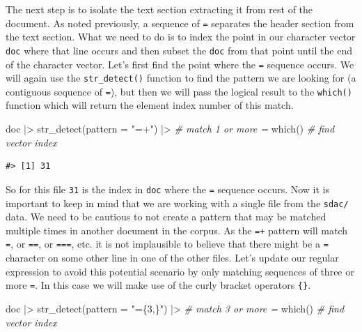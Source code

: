\documentclass[
  letterpaper,
]{latex/krantz}
\newenvironment{Shaded}{\begin{snugshade}}{\end{snugshade}}
\newcommand{\AttributeTok}[1]{\textcolor[rgb]{0.00,0.00,0.00}{#1}}
\newcommand{\CommentTok}[1]{\textcolor[rgb]{0.00,0.00,0.00}{\textit{#1}}}
\newcommand{\FunctionTok}[1]{\textcolor[rgb]{0.00,0.00,0.00}{#1}}
\newcommand{\NormalTok}[1]{\textcolor[rgb]{0.00,0.00,0.00}{#1}}
\newcommand{\SpecialCharTok}[1]{\textcolor[rgb]{0.00,0.00,0.00}{#1}}
\newcommand{\StringTok}[1]{\textcolor[rgb]{0.00,0.00,0.00}{#1}}
\begin{document}
The next step is to isolate the text section extracting it from rest of
the document. As noted previously, a sequence of \texttt{=} separates
the header section from the text section. What we need to do is to index
the point in our character vector \texttt{doc} where that line occurs
and then subset the \texttt{doc} from that point until the end of the
character vector. Let's first find the point where the \texttt{=}
sequence occurs. We will again use the \texttt{str\_detect()} function
to find the pattern we are looking for (a contiguous sequence of
\texttt{=}), but then we will pass the logical result to the
\texttt{which()} function which will return the element index number of
this match.

\begin{Shaded}
\begin{Highlighting}[]
\NormalTok{doc }\SpecialCharTok{|\textgreater{}} 
  \FunctionTok{str\_detect}\NormalTok{(}\AttributeTok{pattern =} \StringTok{"=+"}\NormalTok{) }\SpecialCharTok{|\textgreater{}} \CommentTok{\# match 1 or more \textasciigrave{}=\textasciigrave{}}
  \FunctionTok{which}\NormalTok{() }\CommentTok{\# find vector index}
\end{Highlighting}
\end{Shaded}

\begin{verbatim}
#> [1] 31
\end{verbatim}

So for this file \texttt{31} is the index in \texttt{doc} where the
\texttt{=} sequence occurs. Now it is important to keep in mind that we
are working with a single file from the \texttt{sdac/} data. We need to
be cautious to not create a pattern that may be matched multiple times
in another document in the corpus. As the \texttt{=+} pattern will match
\texttt{=}, or \texttt{==}, or \texttt{===}, etc. it is not implausible
to believe that there might be a \texttt{=} character on some other line
in one of the other files. Let's update our regular expression to avoid
this potential scenario by only matching sequences of three or more
\texttt{=}. In this case we will make use of the curly bracket operators
\texttt{\{\}}.

\begin{Shaded}
\begin{Highlighting}[]
\NormalTok{doc }\SpecialCharTok{|\textgreater{}} 
  \FunctionTok{str\_detect}\NormalTok{(}\AttributeTok{pattern =} \StringTok{"=\{3,\}"}\NormalTok{) }\SpecialCharTok{|\textgreater{}} \CommentTok{\# match 3 or more \textasciigrave{}=\textasciigrave{}}
  \FunctionTok{which}\NormalTok{() }\CommentTok{\# find vector index}
\end{Highlighting}
\end{Shaded}
\end{document}
